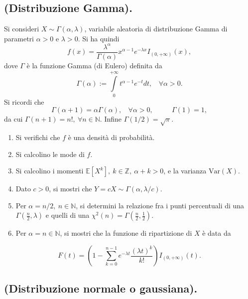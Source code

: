 \subsection{(Distribuzione Gamma).}

Si consideri $X\sim \Gamma ( \alpha ,\lambda )$, variabile aleatoria di distribuzione Gamma di parametri $\alpha  >0$ e $\lambda  >0$. Si ha quindi
\begin{equation*}
f( x) =\frac{\lambda ^{\alpha }}{\Gamma ( \alpha )} x^{\alpha -1} e^{-\lambda x} I_{( 0,+\infty )}( x) ,
\end{equation*}
dove $\Gamma $ è la funzione Gamma (di Eulero) definita da
\begin{equation*}
\Gamma ( \alpha ) :=\int\limits _{0}^{+\infty } t^{\alpha -1} e^{-t} dt,\ \ \ \ \forall \alpha  >0.
\end{equation*}
Si ricordi che
\begin{equation*}
\Gamma ( \alpha +1) =\alpha \Gamma ( \alpha ) ,\ \ \ \ \forall \alpha  >0,\ \ \ \ \ \ \ \ \ \ \ \ \Gamma ( 1) =1,
\end{equation*}
da cui $\Gamma ( n+1) =n!,\ \forall n\in \mathbb{N}$. Infine $\Gamma ( 1/2) =\sqrt{\pi }$.
\begin{enumerate}
\item Si verifichi che $f$ è una densità di probabilità.
\item Si calcolino le mode di $f$.
\item Si calcolino i momenti $\mathbb{E}\left[ X^{k}\right] ,\ k\in \mathbb{Z} ,\ \alpha +k >0$, e la varianza $\mathrm{Var}( X)$.
\item Dato $c >0$, si mostri che $Y=cX\sim \Gamma ( \alpha ,\lambda /c)$.
\item Per $\alpha =n/2,\ n\in \mathbb{N}$, si determini la relazione fra i punti percentuali di una $\Gamma \left(\frac{n}{2} ,\lambda \right)$ e quelli di una $\chi ^{2}( n) =\Gamma \left(\frac{n}{2} ,\frac{1}{2}\right)$.
\item Per $\alpha =n\in \mathbb{N}$, si mostri che la funzione di ripartizione di $X$ è data da
\end{enumerate}
\begin{equation*}
F( t) =\left( 1-\sum\limits _{k=0}^{n-1} e^{-\lambda t}\frac{( \lambda t)^{k}}{k!}\right) I_{( 0,+\infty )}( t) .
\end{equation*}
\subsection{(Distribuzione normale o gaussiana).}

